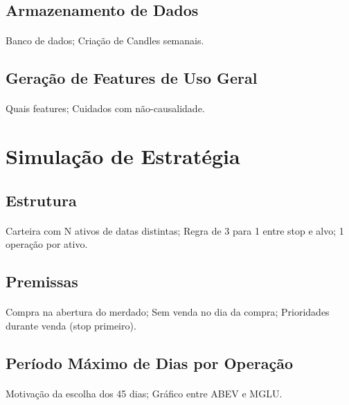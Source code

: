 \subsection{Armazenamento de Dados}
\paragraph{} Banco de dados; Criação de Candles semanais.

\subsection{Geração de Features de Uso Geral}
\paragraph{} Quais features; Cuidados com não-causalidade.


\section{Simulação de Estratégia}

\subsection{Estrutura}
\paragraph{} Carteira com N ativos de datas distintas; Regra de 3 para 1 entre stop e alvo; 1 operação por ativo.

\subsection{Premissas}
\paragraph{} Compra na abertura do merdado; Sem venda no dia da compra; Prioridades durante venda (stop primeiro).

\subsection{Período Máximo de Dias por Operação}
\paragraph{} Motivação da escolha dos 45 dias; Gráfico entre ABEV e MGLU.

